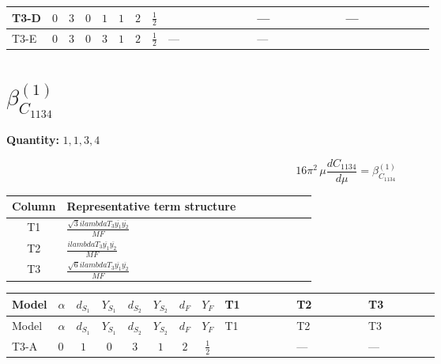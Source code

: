 \documentclass[8pt]{article}
\begin{document}
\begin{landscape}
\begin{longtable}{@{}llcccccc >{\raggedright\arraybackslash}p{0.21\linewidth} >{\raggedright\arraybackslash}p{0.21\linewidth} >{\raggedright\arraybackslash}p{0.21\linewidth}@{}}
\midrule
T3-D & $0$ & $3$ & $0$ & $1$ & $1$ & $2$ & $\frac{1}{2}$ & \scriptsize\adjustbox{max width=\linewidth}{$\begin{gathered} \frac{2 \sqrt{3} lambdaT_{3} \overline{y_{1}} \overline{y_{2}}}{3 MF}\end{gathered}$} & --- & --- \\
\midrule
T3-E & $0$ & $3$ & $0$ & $3$ & $1$ & $2$ & $\frac{1}{2}$ & --- & --- & \scriptsize\adjustbox{max width=\linewidth}{$\begin{gathered} - \frac{2 \sqrt{6} lambdaT_{3} \overline{y_{1}} \overline{y_{2}}}{3 MF}\end{gathered}$} \\
\midrule
\bottomrule
\end{longtable}
\clearpage
\section*{$\beta_{C_{1134}}^{(1)}$}
\noindent\textbf{Quantity: }$\mathrm{1,1,3,4}$\par\smallskip
\[16\pi^2\,\mu\frac{d C_{1134}}{d\mu}=\beta_{C_{1134}}^{(1)}\]
\begin{center}
\begin{tabular}{@{}c >{\raggedright\arraybackslash}p{0.82\linewidth}@{}}
\toprule
Column & Representative term structure \\
\midrule
T1 & \(\displaystyle \frac{\sqrt{3} i lambdaT_{3} \overline{y_{1}} \overline{y_{2}}}{MF}\) \\
\midrule
T2 & \(\displaystyle \frac{i lambdaT_{3} \overline{y_{1}} \overline{y_{2}}}{MF}\) \\
\midrule
T3 & \(\displaystyle \frac{\sqrt{6} i lambdaT_{3} \overline{y_{1}} \overline{y_{2}}}{MF}\) \\
\midrule
\bottomrule
\end{tabular}
\end{center}
\smallskip
\tiny
\begin{longtable}{@{}llcccccc >{\raggedright\arraybackslash}p{0.21\linewidth} >{\raggedright\arraybackslash}p{0.21\linewidth} >{\raggedright\arraybackslash}p{0.21\linewidth}@{}}
\toprule
Model & $\alpha$ & $d_{S_1}$ & $Y_{S_1}$ & $d_{S_2}$ & $Y_{S_2}$ & $d_F$ & $Y_F$ & T1 & T2 & T3 \\
\midrule
\endfirsthead
\toprule
Model & $\alpha$ & $d_{S_1}$ & $Y_{S_1}$ & $d_{S_2}$ & $Y_{S_2}$ & $d_F$ & $Y_F$ & T1 & T2 & T3 \\
\midrule
\endhead
T3-A & $0$ & $1$ & $0$ & $3$ & $1$ & $2$ & $\frac{1}{2}$ & \scriptsize\adjustbox{max width=\linewidth}{$\begin{gathered} \frac{2 \sqrt{3} i lambdaT_{3} \overline{y_{1}} \overline{y_{2}}}{3 MF}\end{gathered}$} & --- & --- \\

\end{longtable}
\end{landscape}
\end{document}
